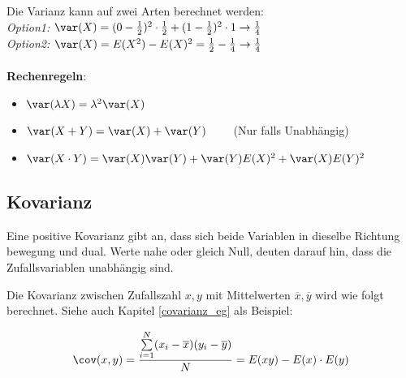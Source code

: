 \noindent Die Varianz kann auf zwei Arten berechnet werden:\\
\textit{Option1:} $\var(X) = (0 - \frac{1}{2})^2 \cdot \frac{1}{2} + (1 - \frac{1}{2})^2 \cdot 1 \xrightarrow{} \frac{1}{4}$\\
\textit{Option2:} $\var(X) = E(X^2) - E(X)^2 = \frac{1}{2} - \frac{1}{4} \rightarrow \frac{1}{4}$
\\ ~\\
\noindent\textbf{Rechenregeln}:
\begin{itemize}[nosep]
	\item $\var(\lambda X) = \lambda^2\var(X)$
	\item $\var(X + Y) = \var(X) + \var(Y) \qquad$ (Nur falls Unabhängig)
	\item $\var(X\cdot Y) = \var(X)\var(Y) + \var(Y)E(X)^2 + \var(X)E(Y)^2$
\end{itemize}

\subsection{Kovarianz}
Eine positive Kovarianz gibt an, dass sich beide Variablen in dieselbe Richtung bewegung und dual. Werte nahe oder gleich Null, deuten darauf hin, dass die Zufallsvariablen unabhängig sind.

Die Kovarianz zwischen Zufallszahl $x,y$ mit Mittelwerten $\overline{x}, \overline{y}$ wird wie folgt berechnet. Siehe auch Kapitel \ref{covarianz_eg} als Beispiel:

\[
\cov(x,y) = \frac{\sum\limits_{i=1}^{N}(x_i - \overline{x})(y_i - \overline{y})}{N} = E(xy) - E(x)\cdot E(y)
\]

